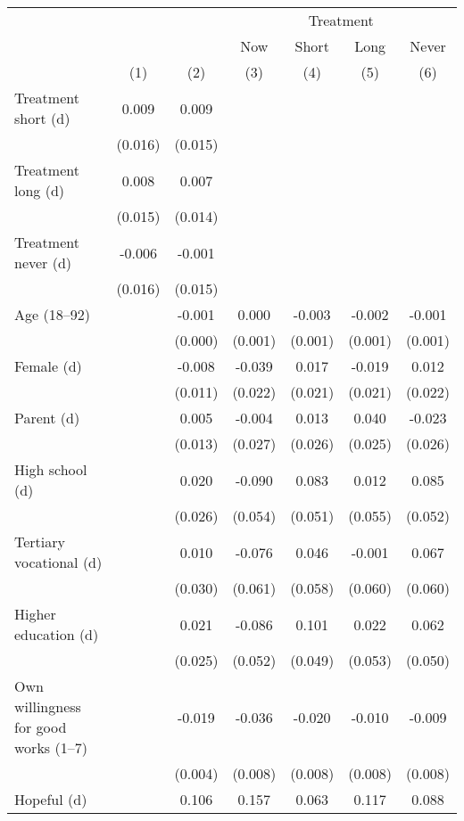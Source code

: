 \begin{table}[t]
\fontsize{12.0pt}{14.4pt}\selectfont
\begin{tabular*}{\linewidth}{@{\extracolsep{\fill}}lcccccc}
\toprule
 &  &  & \multicolumn{4}{c}{Treatment} \\ 
\cmidrule(lr){4-7}
 &  &  & Now & Short & Long & Never \\ 
\cmidrule(lr){4-4} \cmidrule(lr){5-5} \cmidrule(lr){6-6} \cmidrule(lr){7-7}
  & (1) & (2) & (3) & (4) & (5) & (6) \\ 
\midrule\addlinespace[2.5pt]
Treatment short (d) & 0.009 & 0.009 &  &  &  &  \\ 
 & (0.016) & (0.015) &  &  &  &  \\ 
Treatment long (d) & 0.008 & 0.007 &  &  &  &  \\ 
 & (0.015) & (0.014) &  &  &  &  \\ 
Treatment never (d) & -0.006 & -0.001 &  &  &  &  \\ 
 & (0.016) & (0.015) &  &  &  &  \\ 
Age (18--92) &  & -0.001 & 0.000 & -0.003 & -0.002 & -0.001 \\ 
 &  & (0.000) & (0.001) & (0.001) & (0.001) & (0.001) \\ 
Female (d) &  & -0.008 & -0.039 & 0.017 & -0.019 & 0.012 \\ 
 &  & (0.011) & (0.022) & (0.021) & (0.021) & (0.022) \\ 
Parent (d) &  & 0.005 & -0.004 & 0.013 & 0.040 & -0.023 \\ 
 &  & (0.013) & (0.027) & (0.026) & (0.025) & (0.026) \\ 
High school (d) &  & 0.020 & -0.090 & 0.083 & 0.012 & 0.085 \\ 
 &  & (0.026) & (0.054) & (0.051) & (0.055) & (0.052) \\ 
Tertiary vocational (d) &  & 0.010 & -0.076 & 0.046 & -0.001 & 0.067 \\ 
 &  & (0.030) & (0.061) & (0.058) & (0.060) & (0.060) \\ 
Higher education (d) &  & 0.021 & -0.086 & 0.101 & 0.022 & 0.062 \\ 
 &  & (0.025) & (0.052) & (0.049) & (0.053) & (0.050) \\ 
Own willingness for good works (1--7) &  & -0.019 & -0.036 & -0.020 & -0.010 & -0.009 \\ 
 &  & (0.004) & (0.008) & (0.008) & (0.008) & (0.008) \\ 
Hopeful (d) &  & 0.106 & 0.157 & 0.063 & 0.117 & 0.088 \\ 

\end{tabular*}
\end{table}
